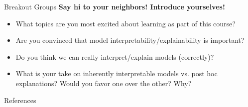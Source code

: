 \documentclass[10pt,aspectratio=169]{beamer}
\begin{document}
\begin{frame}{Breakout Groups}
\textbf{Say hi to your neighbors! Introduce yourselves!}

\begin{itemize}
\item What topics are you most excited about learning as part of this course?
\item Are you convinced that model interpretability/explainability is important?
\item Do you think we can really interpret/explain models (correctly)?
\item What is your take on inherently interpretable models vs. post hoc explanations? Would you favor one over the other? Why?
\end{itemize}
\end{frame}

\begin{frame}[allowframebreaks]{References}


\end{frame}
\end{document}
